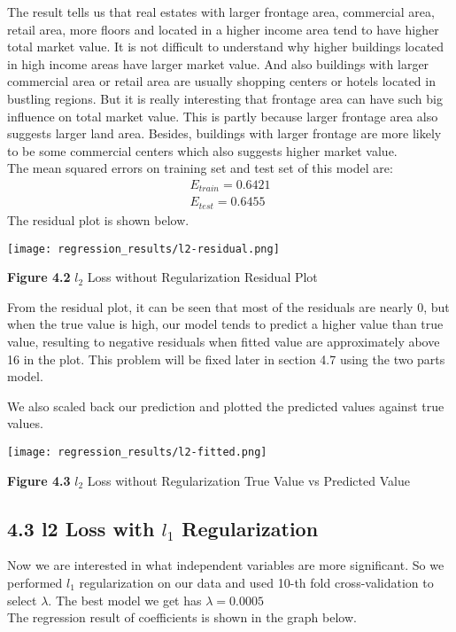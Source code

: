 \documentclass[9pt,twocolumn,twoside]{pnas-new}
\begin{document}
\noindent The result tells us that real estates with larger frontage area, commercial area, retail area, more floors and located in a higher income area tend to have higher total market value. It is not difficult to understand why higher buildings located in high income areas have larger market value. And also buildings with larger commercial area or retail area are usually shopping centers or hotels located in bustling regions. But it is really interesting that frontage area can have such big influence on total market value. This is partly because larger frontage area also suggests larger land area. Besides, buildings with larger frontage are more likely to be some commercial centers which also suggests higher market value.\\

\noindent The mean squared errors on training set and test set of this model are:
\begin{align*}
E_{train} = 0.6421\\
E_{test} = 0.6455
\end{align*}
The residual plot is shown below.

\texttt{[image: regression\_results/l2-residual.png]} 
\begin{center}
\textbf{Figure 4.2} $l_{2}$ Loss without Regularization Residual Plot
\end{center}

\noindent From the residual plot, it can be seen that most of the residuals are nearly 0, but when the true value is high, our model tends to predict a higher value than true value, resulting to negative residuals when fitted value are approximately above 16 in the plot. This problem will be fixed later in section 4.7 using the two parts model.

\noindent We also scaled back our prediction and plotted the predicted values against true values.


\texttt{[image: regression\_results/l2-fitted.png]} 
\begin{center}
\textbf{Figure 4.3} $l_{2}$ Loss without Regularization True Value vs Predicted Value
\end{center}

\subsection*{4.3 l2 Loss with $l_{1}$ Regularization}
Now we are interested in what independent variables are more significant. So we performed $l_{1}$ regularization on our data and used 10-th fold cross-validation to select $\lambda$. The best model we get has  $\lambda = 0.0005$\\
The regression result of coefficients is shown in the graph below.
\end{document}
